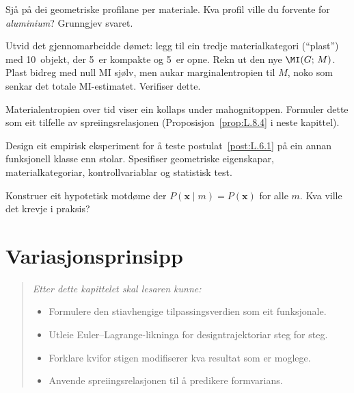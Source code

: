 \begin{exercise}[Nivå 1]\label{ex:7.2}
Sjå på dei geometriske profilane per materiale. Kva profil ville du
forvente for \emph{aluminium}? Grunngjev svaret.
\end{exercise}

\begin{exercise}[Nivå 2]\label{ex:7.3}
Utvid det gjennomarbeidde dømet: legg til ein tredje material\-kategori
(``plast'') med 10~objekt, der 5~er kompakte og 5~er opne. Rekn
ut den nye $\MI(G;\, M)$. Plast bidreg med null MI sjølv, men
aukar marginalentropien til $M$, noko som senkar det totale
MI-estimatet. Verifiser dette.
\end{exercise}

\begin{exercise}[Nivå 2]\label{ex:7.4}
Materialentropien over tid viser ein kollaps under mahognitoppen.
Formuler dette som eit tilfelle av spreiingsrelasjonen
(Proposisjon~\ref{prop:L.8.4} i neste kapittel).
\end{exercise}

\begin{exercise}[Nivå 3]\label{ex:7.5}
Design eit empirisk eksperiment for å teste postulat~\ref{post:L.6.1}
på ein annan funksjonell klasse enn stolar. Spesifiser geometriske
eigenskapar, materialkategoriar, kontrollvariablar og statistisk
test.
\end{exercise}

\begin{exercise}[Nivå 3]\label{ex:7.6}
Konstruer eit hypotetisk motdøme der
$P(\bm{x} \mid m) = P(\bm{x})$ for alle $m$. Kva ville det krevje
i praksis?
\end{exercise}


\chapter{Variasjonsprinsipp}
\label{chap:variasjon}

\begin{quote}\itshape
Etter dette kapittelet skal lesaren kunne:
\begin{itemize}[nosep]
\item Formulere den stiavhengige tilpassingsverdien som eit funksjonale.
\item Utleie Euler--Lagrange-likninga for designtrajektoriar steg for steg.
\item Forklare kvifor stigen modifiserer kva resultat som er moglege.
\item Anvende spreiingsrelasjonen til \aa{} predikere formvarians.
\end{itemize}
\end{quote}

